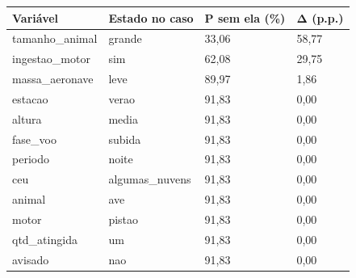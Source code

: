 \begin{tabular}{llll}
\toprule
Variável & Estado no caso & P sem ela (\%) & Δ (p.p.) \\
\midrule
tamanho\_animal & grande & 33,06 & 58,77 \\
ingestao\_motor & sim & 62,08 & 29,75 \\
massa\_aeronave & leve & 89,97 & 1,86 \\
estacao & verao & 91,83 & 0,00 \\
altura & media & 91,83 & 0,00 \\
fase\_voo & subida & 91,83 & 0,00 \\
periodo & noite & 91,83 & 0,00 \\
ceu & algumas\_nuvens & 91,83 & 0,00 \\
animal & ave & 91,83 & 0,00 \\
motor & pistao & 91,83 & 0,00 \\
qtd\_atingida & um & 91,83 & 0,00 \\
avisado & nao & 91,83 & 0,00 \\
\bottomrule
\end{tabular}
